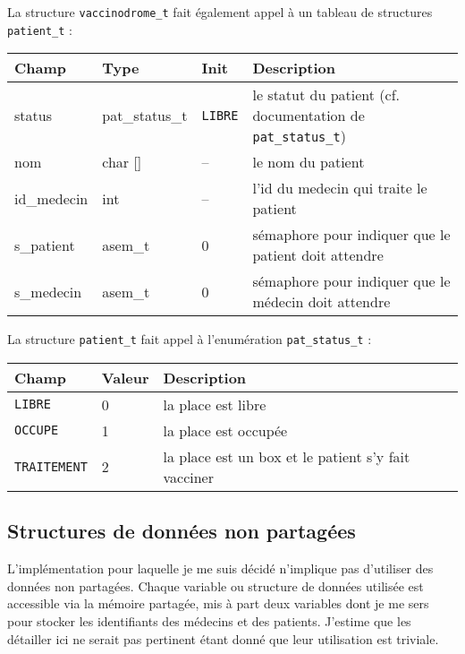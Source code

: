 \documentclass[a4paper]{article}
\begin{document}
\bigskip La structure \texttt{vaccinodrome\_t} fait également appel à un tableau de structures \texttt{patient\_t} :
\bigskip \newline
  \begin{tabularx}{\linewidth}{|l|l|l|X|}
    \hline
    Champ & Type & Init & Description \\ \hline%
    status & pat\_status\_t & \texttt{LIBRE} & le statut du patient (cf. documentation de
    \texttt{pat\_status\_t})\\ \hline%
    nom & char [] & -- & le nom du patient \\ \hline%
    id\_medecin & int & -- & l'id du medecin qui traite le patient \\ \hline%
    s\_patient & asem\_t & 0 & sémaphore pour indiquer que le patient doit attendre \\ \hline%
    s\_medecin & asem\_t & 0 & sémaphore pour indiquer que le médecin doit attendre \\ \hline%
  \end{tabularx}

\bigskip La structure \texttt{patient\_t} fait appel à l'enumération \texttt{pat\_status\_t} :
\bigskip \newline
  \begin{tabularx}{\linewidth}{|l|l|X|}
    \hline
    Champ & Valeur & Description \\ \hline%
    \texttt{LIBRE} & 0 & la place est libre \\ \hline%
    \texttt{OCCUPE} & 1 & la place est occupée \\ \hline%
    \texttt{TRAITEMENT} & 2 & la place est un box et le patient s'y fait vacciner \\ \hline%
  \end{tabularx}
  
\subsection{Structures de données non partagées}

L'implémentation pour laquelle je me suis décidé n'implique pas d'utiliser des données non partagées. Chaque variable ou structure de données utilisée est accessible via la mémoire partagée, mis à part deux variables dont je me sers pour stocker les identifiants des médecins et des patients. J'estime que les détailler ici ne serait pas pertinent étant donné que leur utilisation est triviale.
\end{document}
